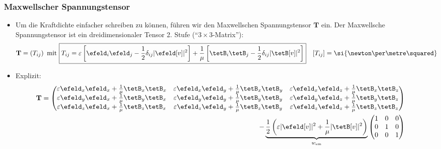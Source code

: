 \begin{frame}
  \frametitle{Maxwellscher Spannungstensor}
  \begin{itemize}[<+->]
  \item Um die Kraftdichte einfacher schreiben zu können, führen wir den \alert{Maxwellschen Spannungstensor} \(\mathbf{T}\) ein. Der Maxwellsche Spannungstensor ist ein dreidimensionaler Tensor 2. Stufe (\enquote{\(3 \times 3\)-Matrix}):
    \begin{equation*}
      \mathbf{T} = \left(T_{ij}\right) \text{ mit } \boxed{T_{ij} = \varepsilon\left[ \efeld_i\efeld_j-\frac{1}{2}\delta_{ij} |\efeld[v]|^2\right] + \frac{1}{\mu} \left[\tetB_i\tetB_j-\frac{1}{2}\delta_{ij} |\tetB[v]|^2\right] } \quad [T_{ij}] = \si{\newton\per\metre\squared} 
    \end{equation*}
  \item Explizit:
    \begin{equation*}
      \begin{split}
      \mathbf{T} =
      \begin{pmatrix}
        \varepsilon\efeld_x\efeld_x + \frac{1}{\mu}\tetB_x\tetB_x & \varepsilon\efeld_x\efeld_y + \frac{1}{\mu}\tetB_x\tetB_y &\varepsilon\efeld_x\efeld_z + \frac{1}{\mu}\tetB_x\tetB_z \\
        \varepsilon\efeld_y\efeld_x + \frac{1}{\mu}\tetB_y\tetB_x & \varepsilon\efeld_y\efeld_y + \frac{1}{\mu}\tetB_y\tetB_y &\varepsilon\efeld_y\efeld_z + \frac{1}{\mu}\tetB_y\tetB_z \\
        \varepsilon\efeld_z\efeld_x + \frac{1}{\mu}\tetB_z\tetB_x & \varepsilon\efeld_z\efeld_y + \frac{1}{\mu}\tetB_z\tetB_y &\varepsilon\efeld_z\efeld_z + \frac{1}{\mu}\tetB_z\tetB_z 
      \end{pmatrix}
      \\ -\underbrace{\frac{1}{2}\left(\varepsilon |\efeld[v]|^2 + \frac{1}{\mu}|\tetB[v]|^2\right)}_{w_\text{em}}
      \begin{pmatrix}
        1 & 0 &0\\
        0 & 1 & 0\\
        0& 0& 1
      \end{pmatrix}
      \end{split}
      \end{equation*}
  \end{itemize}
\end{frame}

